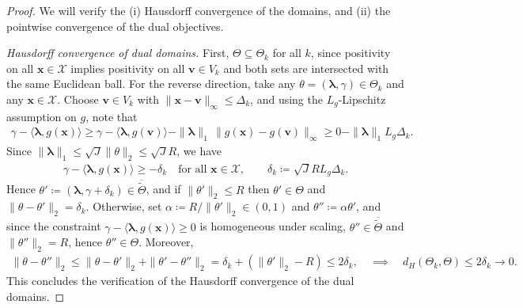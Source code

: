 \documentclass{article}
\theoremstyle{plain}
\theoremstyle{definition}
\newcommand{\calX}{\mathcal X}
\newcommand{\vvec}{\mathbf{v}}
\newcommand{\xvec}{\mathbf{x}}
\newcommand{\qtext}[1]{\quad \text{#1} \quad}
\newcommand{\boldlambda}{\boldsymbol{\lambda}}
\begin{document}
\begin{proof}
We will verify the (i) Hausdorff convergence of the domains, and (ii)  the pointwise convergence of the dual objectives. 


\emph{Hausdorff convergence of dual domains.} First, $\Theta\subseteq \Theta_k$ for all $k$, since positivity on all $\xvec\in\calX$ implies positivity on all $\vvec\in V_k$ and both
sets are intersected with the same Euclidean ball.
For the reverse direction, take any $\theta=(\boldlambda,\gamma)\in\Theta_k$ and any $\xvec\in\calX$. Choose $\vvec\in V_k$ with $\|\xvec-\vvec\|_\infty\le \Delta_k$, and using the $L_g$-Lipschitz assumption on $g$, note that 
\begin{align}
\gamma-\langle \boldlambda,g(\xvec)\rangle \ge \gamma-\langle \boldlambda,g(\vvec)\rangle - \|\boldlambda\|_1\,\|g(\xvec)-g(\vvec)\|_\infty \ge 0 - \|\boldlambda\|_1 L_g\Delta_k.
\end{align}
Since $\|\boldlambda\|_1\le \sqrt{J}\|\theta\|_2\le \sqrt{J}R$, we have
\begin{align}
\gamma-\langle \boldlambda,g(\xvec)\rangle \ge -\delta_k \quad\text{for all }\xvec\in\calX, \qquad \delta_k\coloneqq \sqrt{J}R L_g\Delta_k.
\end{align}
Hence $\theta'\coloneqq (\boldlambda,\gamma+\delta_k)\in \overline{\widetilde\Theta}$, and if  $\|\theta'\|_2\le R$ then $\theta'\in\Theta$ and $\|\theta-\theta'\|_2=\delta_k$. Otherwise, set $\alpha\coloneqq R/\|\theta'\|_2\in(0,1)$ and $\theta''\coloneqq \alpha\theta'$, and since the constraint $\gamma-\langle \boldlambda,g(\xvec)\rangle\ge 0$ is homogeneous under scaling, $\theta''\in\overline{\widetilde\Theta}$ and $\|\theta''\|_2=R$, hence $\theta''\in\Theta$. Moreover,
\begin{align}
\|\theta-\theta''\|_2 \le \|\theta-\theta'\|_2 + \|\theta'-\theta''\|_2
= \delta_k + (\|\theta'\|_2-R) \le 2\delta_k, \qtext{$\implies$}
d_H(\Theta_k,\Theta)\le 2\delta_k \longrightarrow 0.
\end{align}
This concludes the verification of the Hausdorff convergence of the dual domains. 


\end{proof}
\end{document}

